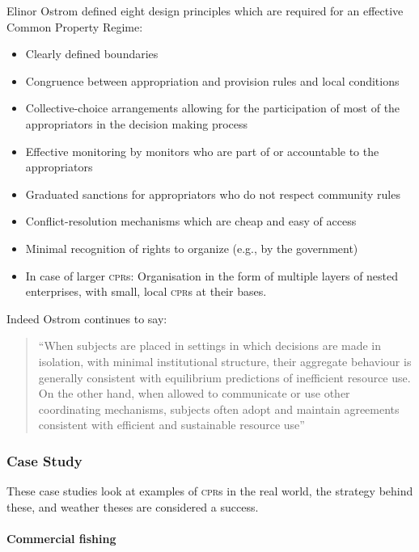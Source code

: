 \documentclass[]{article} %
\begin{document}
Elinor Ostrom defined eight design principles which are required for an effective Common Property Regime:~\cite{Ostrom-90}

\begin{itemize}
	\item Clearly defined boundaries
	\item Congruence between appropriation and provision rules and local conditions
	\item Collective-choice arrangements allowing for the participation of most of the appropriators in the decision making process
	\item Effective monitoring by monitors who are part of or accountable to the appropriators
	\item Graduated sanctions for appropriators who do not respect community rules
	\item Conflict-resolution mechanisms which are cheap and easy of access
	\item Minimal recognition of rights to organize (e.g., by the government)
	\item In case of larger \textsc{cpr}s: Organisation in the form of multiple layers of nested enterprises, with small, local \textsc{cpr}s at their bases.
\end{itemize}

Indeed Ostrom continues to say:

\begin{quote}
	“When subjects are placed in settings in which decisions are made in isolation, with minimal institutional structure, their aggregate behaviour is generally consistent with equilibrium predictions of inefficient resource use. On the other hand, when allowed to communicate or use other coordinating mechanisms, subjects often adopt and maintain agreements consistent with efficient and sustainable resource use”~\cite{Ostrom-rules}
\end{quote}

\subsubsection{Case Study}

These case studies look at examples of \textsc{cpr}s in the real world, the strategy behind these, and weather theses are considered a success.

\paragraph{Commercial fishing}
\end{document}
